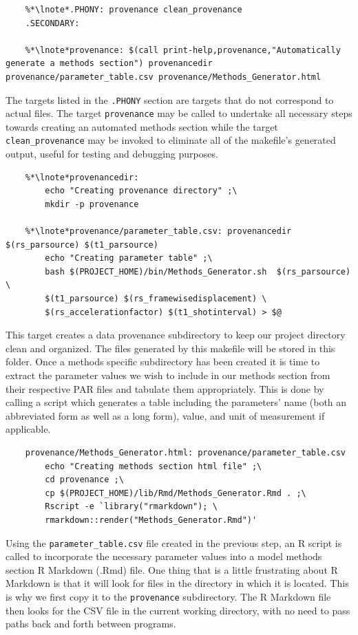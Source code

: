 \newpage

\begin{lstlisting}
	%*\lnote*.PHONY: provenance clean_provenance
	.SECONDARY:
	
	%*\lnote*provenance: $(call print-help,provenance,"Automatically generate a methods section") provenancedir provenance/parameter_table.csv provenance/Methods_Generator.html
\end{lstlisting}

 The targets listed in the \texttt{.PHONY} section are targets that do not correspond to actual files. The target  \texttt{provenance} may be called to undertake all necessary steps towards creating an automated methods section while the target \texttt{clean_provenance} may be invoked to eliminate all of the makefile's generated output, useful for testing and debugging purposes.

\begin{lstlisting}
	%*\lnote*provenancedir: 
		echo "Creating provenance directory" ;\
		mkdir -p provenance
		
	%*\lnote*provenance/parameter_table.csv: provenancedir $(rs_parsource) $(t1_parsource)
		echo "Creating parameter table" ;\
		bash $(PROJECT_HOME)/bin/Methods_Generator.sh  $(rs_parsource) \
		$(t1_parsource) $(rs_framewisedisplacement) \
		$(rs_accelerationfactor) $(t1_shotinterval) > $@
\end{lstlisting}

\lnum{5} This target creates a data provenance subdirectory to keep our project directory clean and organized. The files generated by this makefile will be stored in this folder.  Once a methods specific subdirectory has been created it is time to extract the parameter values we wish to include in our methods section from their respective PAR files and tabulate them appropriately. This is done by  calling a \bashn{} script which generates a table including the parameters' name (both an abbreviated form as well as a long form), value, and unit of measurement if applicable.

\begin{lstlisting}
	provenance/Methods_Generator.html: provenance/parameter_table.csv
		echo "Creating methods section html file" ;\
		cd provenance ;\
		cp $(PROJECT_HOME)/lib/Rmd/Methods_Generator.Rmd . ;\
		Rscript -e `library("rmarkdown"); \
		rmarkdown::render("Methods_Generator.Rmd")'
\end{lstlisting}

Using the \texttt{parameter_table.csv} file created in the previous step,  an R script is called to incorporate the necessary parameter values into a model methods section R Markdown (.Rmd) file. One thing that is a little frustrating about R Markdown is that it will look for files in the directory in which it is located. This is why we first copy it to the \texttt{provenance} subdirectory. The R Markdown file then looks for the CSV file in the current working directory, with no need to pass paths back and forth between programs. 

